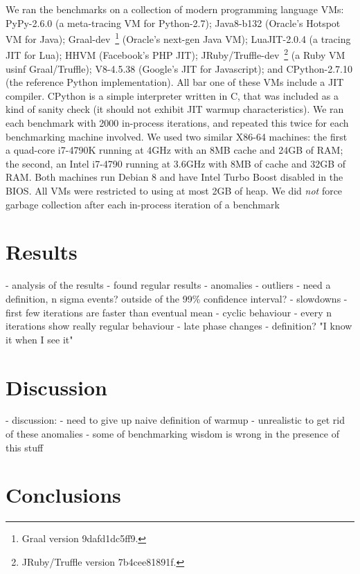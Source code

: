 \documentclass[10pt,preprint]{sigplanconf}
\begin{document}
We ran the benchmarks on a collection of modern programming language VMs:
PyPy-2.6.0 (a meta-tracing VM for Python-2.7); Java8-b132 (Oracle's Hotspot VM
for Java); Graal-dev~\footnote{Graal version 9dafd1dc5ff9.} (Oracle's next-gen
Java VM); LuaJIT-2.0.4 (a tracing JIT for Lua); HHVM (Facebook's PHP JIT);
JRuby/Truffle-dev~\footnote{JRuby/Truffle version 7b4cee81891f.} (a Ruby VM
usinf Graal/Truffle); V8-4.5.38 (Google's JIT for Javascript); and
CPython-2.7.10 (the reference Python implementation). All bar one of
these VMs include a JIT compiler. CPython is a simple interpreter written in C,
that was included as a kind of sanity check (it should not exhibit JIT warmup
characteristics). We ran each benchmark with 2000 in-process iterations,
and repeated this twice for each benchmarking machine involved. We used two
similar X86-64 machines: the first a quad-core i7-4790K running at 4GHz with
an 8MB cache and 24GB of RAM; the second, an Intel i7-4790 running at 3.6GHz
with 8MB of cache and 32GB of RAM. Both machines run Debian 8 and have Intel
Turbo Boost disabled in the BIOS. All VMs were restricted to using at most
2GB of heap. We did \emph{not} force garbage collection after each
in-process iteration of a benchmark 

\section{Results}
\label{sec:Results}

- analysis of the results
  - found regular results
  - anomalies
  - outliers
    - need a definition, n sigma events? outside of the 99\% confidence interval?
  - slowdowns
    - first few iterations are faster than eventual mean
  - cyclic behaviour
    - every n iterations show really regular behaviour
  - late phase changes
    - definition? "I know it when I see it"

\section{Discussion}
\label{sec:Discussion}

  - discussion:
    - need to give up naive definition of warmup
    - unrealistic to get rid of these anomalies
    - some of benchmarking wisdom is wrong in the presence of this stuff


\section{Conclusions}
\label{sec:conclusion}



\end{document}
